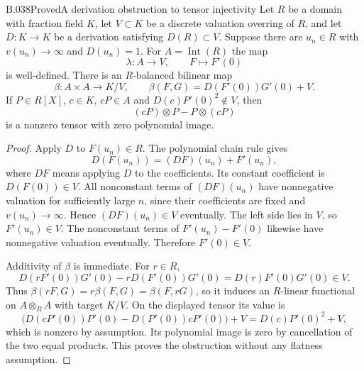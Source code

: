 \begin{saresult}{B.038}{Proved}{A derivation obstruction to tensor injectivity}
Let $R$ be a domain with fraction field $K$, let $V\subset K$ be
a discrete valuation overring of $R$, and let $D:K\to K$ be a
derivation satisfying $D(R)\subset V$. Suppose there are
$u_n\in R$ with $v(u_n)\to\infty$ and $D(u_n)=1$.
For $A=\operatorname{Int}(R)$ the map
\[
 \lambda:A\longrightarrow V,\qquad F\longmapsto F'(0)
\]
is well-defined. There is an $R$-balanced bilinear map
\[
 \beta:A\times A\longrightarrow K/V,
 \qquad \beta(F,G)=D(F'(0))G'(0)+V.
\]
If $P\in R[X]$, $c\in K$, $cP\in A$ and
$D(c)P'(0)^2\notin V$, then
\[
 (cP)\otimes P-P\otimes(cP)
\]
is a nonzero tensor with zero polynomial image.
\end{saresult}
\begin{proof}
Apply $D$ to $F(u_n)\in R$. The polynomial chain rule gives
\[
 D(F(u_n))=(DF)(u_n)+F'(u_n),
\]
where $DF$ means applying $D$ to the coefficients.
Its constant coefficient is $D(F(0))\in V$.
All nonconstant terms of $(DF)(u_n)$ have nonnegative valuation
for sufficiently large $n$, since their coefficients are fixed
and $v(u_n)\to\infty$. Hence $(DF)(u_n)\in V$ eventually.
The left side lies in $V$, so $F'(u_n)\in V$.
The nonconstant terms of $F'(u_n)-F'(0)$ likewise have
nonnegative valuation eventually. Therefore $F'(0)\in V$.

Additivity of $\beta$ is immediate. For $r\in R$,
\[
 D(rF'(0))G'(0)-rD(F'(0))G'(0)
   =D(r)F'(0)G'(0)\in V.
\]
Thus $\beta(rF,G)=r\beta(F,G)=\beta(F,rG)$, so it induces
an $R$-linear functional on $A\otimes_RA$ with target $K/V$.
On the displayed tensor its value is
\[
 \bigl(D(cP'(0))P'(0)-D(P'(0))cP'(0)\bigr)+V
   =D(c)P'(0)^2+V,
\]
which is nonzero by assumption. Its polynomial image is zero
by cancellation of the two equal products. This proves the
obstruction without any flatness assumption.
\end{proof}

